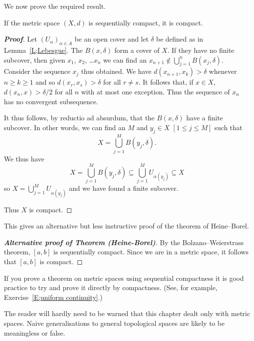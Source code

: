 We now prove the required result.

\begin{theorem}\label{T;sequence implies compact}
If the metric space $(X,d)$ is sequentially compact, it is compact.
\end{theorem}
\begin{proof}[\bf Proof] Let $(U_{\alpha})_{\alpha\in A}$ be an open cover
and let $\delta$ be defined as in Lemma~\ref{L;Lebesgue}.
The $B(x,\delta)$ form a cover of $X$. If they have no finite
subcover, then given $x_{1}$, $x_{2}$, \dots $x_{n}$
we can find an $x_{n+1}\notin\bigcup_{j=1}^{n}B(x_{j},\delta)$.
Consider the sequence $x_{j}$ thus obtained.
We have $d(x_{n+1},x_{k})>\delta$ whenever $n\geq k\geq 1$
and so $d(x_{r},x_{s})>\delta$ for all $r\neq s$.
It follows that, if $x\in X$, $d(x_{n},x)>\delta/2$
for all $n$ with at most one exception. Thus
the sequence of $x_{n}$ has no convergent subsequence.

It thus follows, by reductio ad absurdum, that the
$B(x,\delta)$ have a finite subcover. In other words,
we can find
an $M$ and $y_{j}\in X$ $[1\leq j\leq M]$ such that
\[X=\bigcup_{j=1}^{M}B(y_{j},\delta).\]
We thus have
\[X=\bigcup_{j=1}^{M}B(y_{j},\delta)
\subseteq \bigcup_{j=1}^{M}U_{\alpha(y_{j})}\subseteq X\]
so $X=\bigcup_{j=1}^{M}U_{\alpha(y_{j})}$ and we have
found a finite subcover.

Thus $X$ is compact.
\end{proof}

This gives an alternative but less instructive
proof of the theorem of Heine--Borel.

\begin{proof}[\bf Alternative proof of Theorem (Heine-Borel)]%
\label{Alternative Heine--Borel}
By the Bolzano--Weierstrass theorem, $[a,b]$ is
sequentially compact. Since we are in a metric space,
it follows that $[a,b]$ is compact.
\end{proof}


If you prove a theorem on metric spaces using
sequential compactness it is good practice to
try and prove it directly by compactness.
(See, for example,
Exercise~\ref{E;uniform continuity}.)

The reader will hardly need to be warned that this chapter
dealt only with metric spaces. Naive generalisations
to general topological spaces are likely to be meaningless
or false.


